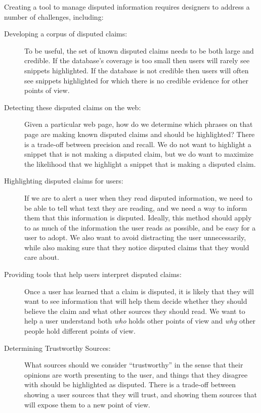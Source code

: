 \documentclass{www2010-accepted}
\begin{document}
Creating a tool to manage disputed information requires designers to address a number of challenges, including:

\begin{description}
\item[Developing a corpus of disputed claims:] To be useful, the set of known disputed claims needs to be both large and credible. If the database's coverage is too small then users will rarely see snippets highlighted. If the database is not credible then users will often see snippets highlighted for which there is no credible evidence for other points of view.

\item[Detecting these disputed claims on the web:] Given a particular web page, how do we determine which phrases on that page are making known disputed claims and should be highlighted? There is a trade-off between precision and recall. We do not want to highlight a snippet that is not making a disputed claim, but we do want to maximize the likelihood that we highlight a snippet that is making a disputed claim.

\item[Highlighting disputed claims for users:] If we are to alert a user when they read disputed information, we need to be able to tell what text they are reading, and we need a way to inform them that this information is disputed. Ideally, this method should apply to as much of the information the user reads as possible, and be easy for a user to adopt. We also want to avoid distracting the user unnecessarily, while also making sure that they notice disputed claims that they would care about.

\item[Providing tools that help users interpret disputed claims:] Once a user has learned that a claim is disputed, it is likely that they will want to see information that will help them decide whether they should believe the claim and what other sources they should read. We want to help a user understand both {\it who} holds other points of view and {\it why} other people hold different points of view.

\item[Determining Trustworthy Sources:] What sources should we consider ``trustworthy'' in the sense that their opinions are worth presenting to the user, and things that they disagree with should be highlighted as disputed. There is a trade-off between showing a user sources that they will trust, and showing them sources that will expose them to a new point of view.
\end{description}
\end{document}
